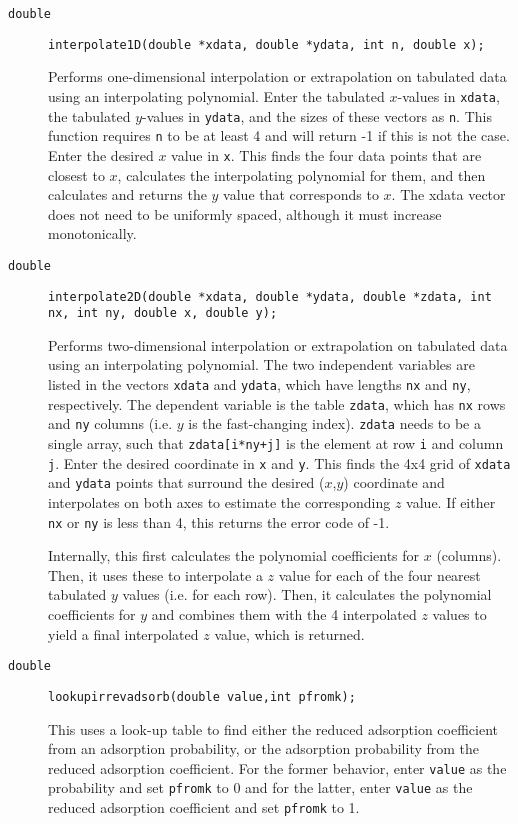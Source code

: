 \documentclass[11pt]{article}
\newcommand {\ttt} {\texttt}
\begin{document}
\begin{description}

\item[\ttt{double}]
\ttt{interpolate1D(double *xdata, double *ydata, int n, double x);}

Performs one-dimensional interpolation or extrapolation on tabulated data using an interpolating polynomial. Enter the tabulated $x$-values in \ttt{xdata}, the tabulated $y$-values in \ttt{ydata}, and the sizes of these vectors as \ttt{n}. This function requires \ttt{n} to be at least 4 and will return -1 if this is not the case. Enter the desired $x$ value in \ttt{x}. This finds the four data points that are closest to $x$, calculates the interpolating polynomial for them, and then calculates and returns the $y$ value that corresponds to $x$. The xdata vector does not need to be uniformly spaced, although it must increase monotonically.

\item[\ttt{double}]
\ttt{interpolate2D(double *xdata, double *ydata, double *zdata, int nx, int ny, double x, double y);}

Performs two-dimensional interpolation or extrapolation on tabulated data using an interpolating polynomial. The two independent variables are listed in the vectors \ttt{xdata} and \ttt{ydata}, which have lengths \ttt{nx} and \ttt{ny}, respectively. The dependent variable is the table \ttt{zdata}, which has \ttt{nx} rows and \ttt{ny} columns (i.e. $y$ is the fast-changing index). \ttt{zdata} needs to be a single array, such that \ttt{zdata[i*ny+j]} is the element at row \ttt{i} and column \ttt{j}. Enter the desired coordinate in \ttt{x} and \ttt{y}. This finds the 4x4 grid of \ttt{xdata} and \ttt{ydata} points that surround the desired ($x$,$y$) coordinate and interpolates on both axes to estimate the corresponding $z$ value. If either \ttt{nx} or \ttt{ny} is less than 4, this returns the error code of -1.

Internally, this first calculates the polynomial coefficients for $x$ (columns). Then, it uses these to interpolate a $z$ value for each of the four nearest tabulated $y$ values (i.e. for each row). Then, it calculates the polynomial coefficients for $y$ and combines them with the 4 interpolated $z$ values to yield a final interpolated $z$ value, which is returned.


\item[\ttt{double}]
\ttt{lookupirrevadsorb(double value,int pfromk);}

This uses a look-up table to find either the reduced adsorption coefficient from an adsorption probability, or the adsorption probability from the reduced adsorption coefficient. For the former behavior, enter \ttt{value} as the probability and set \ttt{pfromk} to 0 and for the latter, enter \ttt{value} as the reduced adsorption coefficient and set \ttt{pfromk} to 1.


\end{description}
\end{document}
